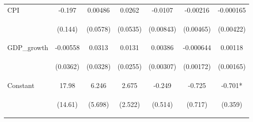 \documentclass[]{article}
\begin{document}
\begin{center}
\begin{tabular}{lcccccc}
CPI & -0.197 & 0.00486 & 0.0262 & -0.0107 & -0.00216 & -0.000165 \\
\vspace{4pt} & \begin{footnotesize}(0.144)\end{footnotesize} & \begin{footnotesize}(0.0578)\end{footnotesize} & \begin{footnotesize}(0.0535)\end{footnotesize} & \begin{footnotesize}(0.00843)\end{footnotesize} & \begin{footnotesize}(0.00465)\end{footnotesize} & \begin{footnotesize}(0.00422)\end{footnotesize} \\
GDP\_growth & -0.00558 & 0.0313 & 0.0131 & 0.00386 & -0.000644 & 0.00118 \\
\vspace{4pt} & \begin{footnotesize}(0.0362)\end{footnotesize} & \begin{footnotesize}(0.0328)\end{footnotesize} & \begin{footnotesize}(0.0255)\end{footnotesize} & \begin{footnotesize}(0.00307)\end{footnotesize} & \begin{footnotesize}(0.00172)\end{footnotesize} & \begin{footnotesize}(0.00165)\end{footnotesize} \\
Constant & 17.98 & 6.246 & 2.675 & -0.249 & -0.725 & -0.701* \\
 & \begin{footnotesize}(14.61)\end{footnotesize} & \begin{footnotesize}(5.698)\end{footnotesize} & \begin{footnotesize}(2.522)\end{footnotesize} & \begin{footnotesize}(0.514)\end{footnotesize} & \begin{footnotesize}(0.717)\end{footnotesize} & \begin{footnotesize}(0.359)\end{footnotesize} \\

\end{tabular}
\end{center}
\end{document}
